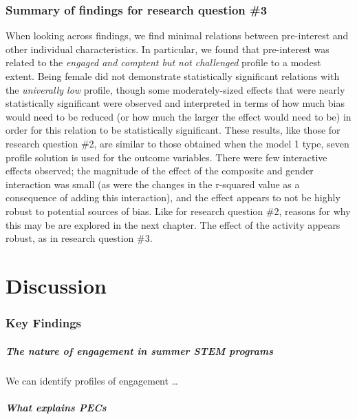 \documentclass[]{msu-thesis}
\let\oldparagraph\paragraph
\renewcommand{\paragraph}[1]{\oldparagraph{#1}\mbox{}}
\theoremstyle{definition}
\theoremstyle{definition}
\theoremstyle{definition}
\theoremstyle{remark}
\begin{document}
\subsection{Summary of findings for research question
\#3}\label{summary-of-findings-for-research-question-3}

When looking across findings, we find minimal relations between
pre-interest and other individual characteristics. In particular, we
found that pre-interest was related to the \emph{engaged and comptent
but not challenged} profile to a modest extent. Being female did not
demonstrate statistically significant relations with the
\emph{univerally low} profile, though some moderately-sized effects that
were nearly statistically significant were observed and interpreted in
terms of how much bias would need to be reduced (or how much the larger
the effect would need to be) in order for this relation to be
statistically significant. These results, like those for research
question \#2, are similar to those obtained when the model 1 type, seven
profile solution is used for the outcome variables. There were few
interactive effects observed; the magnitude of the effect of the
composite and gender interaction was small (as were the changes in the
r-squared value as a consequence of adding this interaction), and the
effect appears to not be highly robust to potential sources of bias.
Like for research question \#2, reasons for why this may be are explored
in the next chapter. The effect of the activity appears robust, as in
research question \#3.

\chapter{Discussion}\label{discussion}

\subsection{Key Findings}\label{key-findings}

\paragraph{The nature of engagement in summer STEM
programs}\label{the-nature-of-engagement-in-summer-stem-programs}

We can identify profiles of engagement \ldots{}

\paragraph{What explains PECs}\label{what-explains-pecs}
\end{document}
